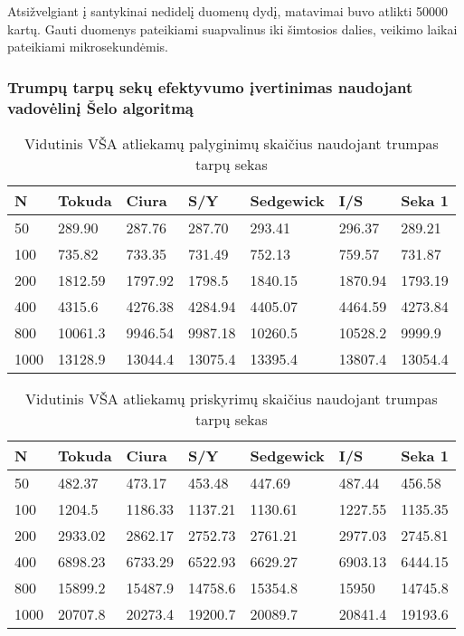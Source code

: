 \documentclass{VUMIFInfKursinis}
\begin{document}
Atsižvelgiant į santykinai nedidelį duomenų dydį, matavimai buvo atlikti 50000 kartų.
Gauti duomenys pateikiami suapvalinus iki šimtosios dalies, veikimo laikai pateikiami mikrosekundėmis.

\subsubsection{Trumpų tarpų sekų efektyvumo įvertinimas naudojant vadovėlinį Šelo algoritmą}

\begin{table}[H]
  \caption{Vidutinis VŠA atliekamų palyginimų skaičius naudojant trumpas tarpų sekas}
  \begin{tabular}{|l|l|l|l|l|l|l|}
  \hline
  N    & Tokuda  & Ciura   & S/Y     & Sedgewick & I/S     & Seka 1      \\ \hline
  50   & 289.90  & 287.76  & 287.70  & 293.41    & 296.37  & 289.21  \\ \hline
  100  & 735.82  & 733.35  & 731.49  & 752.13    & 759.57  & 731.87  \\ \hline
  200  & 1812.59 & 1797.92 & 1798.5  & 1840.15   & 1870.94 & 1793.19 \\ \hline
  400  & 4315.6  & 4276.38 & 4284.94 & 4405.07   & 4464.59 & 4273.84 \\ \hline
  800  & 10061.3 & 9946.54 & 9987.18 & 10260.5   & 10528.2 & 9999.9  \\ \hline
  1000 & 13128.9 & 13044.4 & 13075.4 & 13395.4   & 13807.4 & 13054.4 \\ \hline
  \end{tabular}
  \end{table}

\begin{table}[H]
  \caption{Vidutinis VŠA atliekamų priskyrimų skaičius naudojant trumpas tarpų sekas}
  \begin{tabular}{|l|l|l|l|l|l|l|}
  \hline
  N    & Tokuda  & Ciura   & S/Y     & Sedgewick & I/S     & Seka 1      \\ \hline
  50   & 482.37  & 473.17  & 453.48  & 447.69    & 487.44  & 456.58  \\ \hline
  100  & 1204.5  & 1186.33 & 1137.21 & 1130.61   & 1227.55 & 1135.35 \\ \hline
  200  & 2933.02 & 2862.17 & 2752.73 & 2761.21   & 2977.03 & 2745.81 \\ \hline
  400  & 6898.23 & 6733.29 & 6522.93 & 6629.27   & 6903.13 & 6444.15 \\ \hline
  800  & 15899.2 & 15487.9 & 14758.6 & 15354.8   & 15950   & 14745.8 \\ \hline
  1000 & 20707.8 & 20273.4 & 19200.7 & 20089.7   & 20841.4 & 19193.6 \\ \hline
  \end{tabular}
  \end{table}
\end{document}
